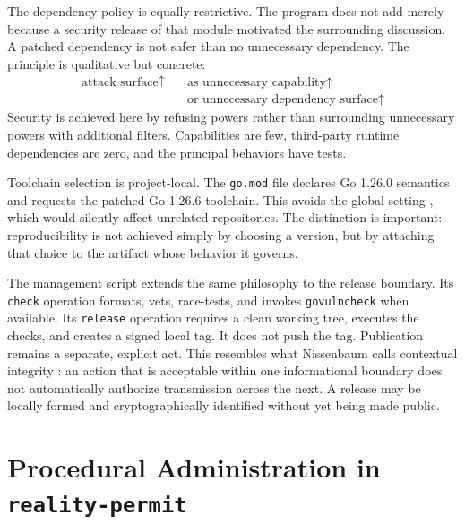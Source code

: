 \documentclass[11pt]{article}
\begin{document}
The dependency policy is equally restrictive. The program does not add  merely because a security release of that module motivated the surrounding discussion. A patched dependency is not safer than no unnecessary dependency. The principle is qualitative but concrete:
\begin{equation}
  \begin{aligned}
    \text{attack surface}\uparrow\quad &\text{as unnecessary capability}\uparrow\\
                                      &\text{or unnecessary dependency surface}\uparrow
  \end{aligned}
  \label{eq:attack-surface}
\end{equation}
Security is achieved here by refusing powers rather than surrounding unnecessary powers with additional filters. Capabilities are few, third-party runtime dependencies are zero, and the principal behaviors have tests.

Toolchain selection is project-local. The \texttt{go.mod} file declares Go 1.26.0 semantics and requests the patched Go 1.26.6 toolchain. This avoids the global setting , which would silently affect unrelated repositories. The distinction is important: reproducibility is not achieved simply by choosing a version, but by attaching that choice to the artifact whose behavior it governs.

The management script extends the same philosophy to the release boundary. Its \texttt{check} operation formats, vets, race-tests, and invokes \texttt{govulncheck} when available. Its \texttt{release} operation requires a clean working tree, executes the checks, and creates a signed local tag. It does not push the tag. Publication remains a separate, explicit act. This resembles what Nissenbaum calls contextual integrity \cite{nissenbaum2010}: an action that is acceptable within one informational boundary does not automatically authorize transmission across the next. A release may be locally formed and cryptographically identified without yet being made public.

\section{Procedural Administration in \texttt{reality-permit}}
\end{document}
